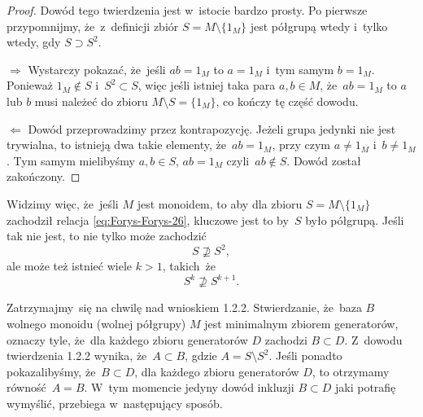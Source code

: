 \documentclass[a4paper,11pt]{article}
\begin{document}
\begin{proof}

  Dowód tego twierdzenia jest w~istocie bardzo prosty. Po pierwsze
  przypomnijmy, że~z~definicji zbiór $S = M \setminus \{ 1_{ M } \}$
  jest półgrupą wtedy i~tylko wtedy, gdy $S \supset S^{ 2 }$.

  $\Rightarrow$ Wystarczy pokazać, że~jeśli $a b = 1_{ M }$ to
  $a = 1_{ M }$ i~tym samym $b = 1_{ M }$. Ponieważ $1_{ M } \notin S$
  i~$S^{ 2 } \subset S$, więc jeśli istniej taka para $a, b \in M$,
  że~$ab = 1_{ M }$ to $a$ lub $b$ musi należeć do zbioru
  $M \setminus S = \{ 1_{ M } \}$, co kończy tę część dowodu.

  $\Leftarrow$ Dowód przeprowadzimy przez kontrapozycję. Jeżeli grupa jedynki
  nie jest trywialna, to istnieją dwa takie elementy,
  że~$a b = 1_{ M }$, przy czym $a \neq 1_{ M }$ i~$b \neq 1_{ M }$.
  Tym samym mielibyśmy $a, b \in S$, $ab = 1_{ M }$
  czyli~$ab \notin S$. Dowód został zakończony.

\end{proof}





Widzimy więc, że~jeśli $M$ jest monoidem, to aby dla zbioru
$S = M \setminus \{ 1_{ M } \}$ zachodził relacja
\eqref{eq:Forys-Forys-26}, kluczowe jest to by~$S$ było półgrupą.
Jeśli tak nie jest, to nie tylko może zachodzić
\begin{equation}
  \label{eq:Forys-Forys-32}
  S \nsupseteq S^{ 2 },
\end{equation}
ale może też istnieć wiele $k > 1$, takich~że
\begin{equation}
  \label{eq:Forys-Forys-33}
  S^{ k } \nsupseteq S^{ k + 1 }.
\end{equation}

\vspace{\spaceFour}





 Zatrzymajmy~się na chwilę nad wnioskiem 1.2.2.
Stwierdzanie, że~baza $B$ wolnego monoidu (wolnej półgrupy) $M$ jest
minimalnym zbiorem generatorów, oznaczy tyle, że~dla każdego zbioru
generatorów $D$ zachodzi $B \subset D$. Z~dowodu twierdzenia 1.2.2
wynika, że~$A \subset B$, gdzie $A = S \setminus S^{ 2 }$. Jeśli ponadto pokazalibyśmy,
że~$B \subset D$, dla każdego zbioru generatorów $D$, to otrzymamy
równość~$A = B$. W~tym momencie jedyny dowód inkluzji $B \subset D$ jaki
potrafię wymyślić, przebiega w~następujący sposób.
\end{document}
